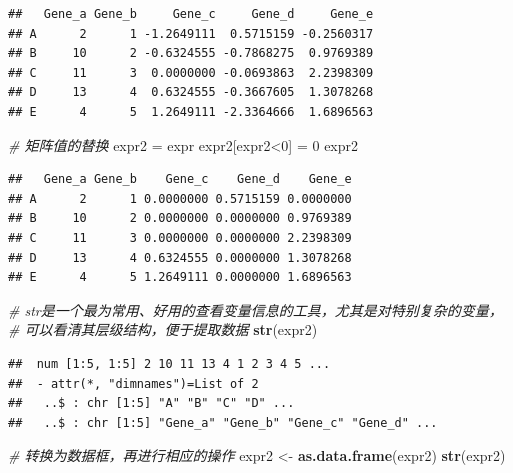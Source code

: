 \documentclass[]{article}
\newenvironment{Shaded}{\begin{snugshade}}{\end{snugshade}}
\newcommand{\KeywordTok}[1]{\textcolor[rgb]{0.13,0.29,0.53}{\textbf{{#1}}}}
\newcommand{\DecValTok}[1]{\textcolor[rgb]{0.00,0.00,0.81}{{#1}}}
\newcommand{\StringTok}[1]{\textcolor[rgb]{0.31,0.60,0.02}{{#1}}}
\newcommand{\CommentTok}[1]{\textcolor[rgb]{0.56,0.35,0.01}{\textit{{#1}}}}
\newcommand{\NormalTok}[1]{{#1}}
\numberwithin{figure}{section}
\numberwithin{table}{section}
\theoremstyle{definition}
\theoremstyle{definition}
\theoremstyle{definition}
\theoremstyle{remark}
\begin{document}
\begin{verbatim}
##   Gene_a Gene_b     Gene_c     Gene_d     Gene_e
## A      2      1 -1.2649111  0.5715159 -0.2560317
## B     10      2 -0.6324555 -0.7868275  0.9769389
## C     11      3  0.0000000 -0.0693863  2.2398309
## D     13      4  0.6324555 -0.3667605  1.3078268
## E      4      5  1.2649111 -2.3364666  1.6896563
\end{verbatim}

\begin{Shaded}
\begin{Highlighting}[]
\CommentTok{# 矩阵值的替换}
\NormalTok{expr2 =}\StringTok{ }\NormalTok{expr}
\NormalTok{expr2[expr2<}\DecValTok{0}\NormalTok{] =}\StringTok{ }\DecValTok{0}
\NormalTok{expr2}
\end{Highlighting}
\end{Shaded}

\begin{verbatim}
##   Gene_a Gene_b    Gene_c    Gene_d    Gene_e
## A      2      1 0.0000000 0.5715159 0.0000000
## B     10      2 0.0000000 0.0000000 0.9769389
## C     11      3 0.0000000 0.0000000 2.2398309
## D     13      4 0.6324555 0.0000000 1.3078268
## E      4      5 1.2649111 0.0000000 1.6896563
\end{verbatim}

\begin{Shaded}
\end{Shaded}

\begin{Shaded}
\begin{Highlighting}[]
\CommentTok{# str是一个最为常用、好用的查看变量信息的工具，尤其是对特别复杂的变量，}
\CommentTok{#    可以看清其层级结构，便于提取数据}
\KeywordTok{str}\NormalTok{(expr2)}
\end{Highlighting}
\end{Shaded}

\begin{verbatim}
##  num [1:5, 1:5] 2 10 11 13 4 1 2 3 4 5 ...
##  - attr(*, "dimnames")=List of 2
##   ..$ : chr [1:5] "A" "B" "C" "D" ...
##   ..$ : chr [1:5] "Gene_a" "Gene_b" "Gene_c" "Gene_d" ...
\end{verbatim}

\begin{Shaded}
\begin{Highlighting}[]
\CommentTok{# 转换为数据框，再进行相应的操作}
\NormalTok{expr2 <-}\StringTok{ }\KeywordTok{as.data.frame}\NormalTok{(expr2)}
\KeywordTok{str}\NormalTok{(expr2)}
\end{Highlighting}
\end{Shaded}
\end{document}

